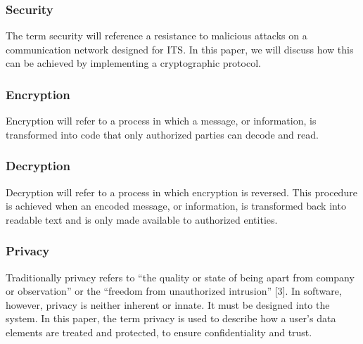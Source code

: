 \documentclass[conference,compsoc]{IEEEtran}
\begin{document}
\subsubsection{Security}
The term security will reference a resistance to malicious attacks on a communication network designed for ITS. In this paper, we will discuss how this can be achieved by implementing a cryptographic protocol.
\subsubsection{Encryption}
Encryption will refer to a process in which a message, or information, is transformed into code that only authorized parties can decode and read.
\subsubsection{Decryption}
Decryption will refer to a process in which encryption is reversed. This procedure is achieved when an encoded message, or information, is transformed back into readable text and is only made available to authorized entities.
\subsubsection{Privacy}
Traditionally privacy refers to “the quality or state of being apart from company or observation” or the “freedom from unauthorized intrusion” [3]. In software, however, privacy is neither inherent or innate. It must be designed into the system. In this paper, the term privacy is used to describe how a user’s data elements are treated and protected, to ensure confidentiality and trust.
\end{document}
